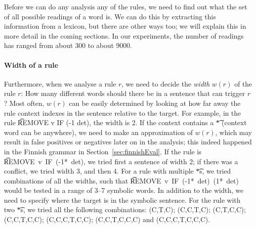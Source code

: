 Before we can do any analysis any of the rules, we need to find out what the set of all possible readings of a word is. We can do this by extracting this information from a lexicon, but there are other ways too; we will explain this in more detail in the coming sections. In our experiments, the number of readings has ranged from about 300 to about 9000. 

\paragraph{Width of a rule}
Furthermore, when we analyse a rule $r$, we need to decide the {\em width} $w(r)$ of the rule $r$: How many different words should there be in a sentence that can trigger $r$? Most often, $w(r)$ can be easily determined by looking at how far away the rule context indexes in the sentence relative to the target. For example, in the rule \t{REMOVE v IF (-1 det)}, the width is 2.
If the context contains a \t{*} (context word can be anywhere),
we need to make an approximation of $w(r)$, which may result in false positives or negatives later on in the analysis; this indeed happened in the Finnish grammar in Section~\ref{sec:finnishEval}. %
If the rule is \t{REMOVE~v~IF~(-1*~det)}, 
we tried first a sentence of width 2; if there was a conflict, we tried width 3, and then 4. For a rule with multiple \t{*}s, we tried combinations of all the widths, such that \t{REMOVE~v~IF~(-1*~det)~(1*~det)} would be tested in a range of 3--7 symbolic words. 
In addition to the width, we need to specify where the target is in the symbolic sentence. For the rule with two \t{*}s, we tried all the following combinations: 
(C,T,C); 
(C,C,T,C); 
(C,T,C,C); 
(C,C,T,C,C); 
(C,C,C,T,C,C); 
(C,C,T,C,C,C) and
(C,C,C,T,C,C,C).



